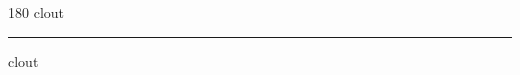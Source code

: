 
\begin{frame}
\begin{center}
\begin{turn}{180}
{\fontsize{2.5cm}{1em}\selectfont clout}
\end{turn}
\vspace{1em}\par  
\hrule
\vspace{1em}\par  
{\fontsize{2.5cm}{1em}\selectfont clout}
\end{center}
\end{frame}
